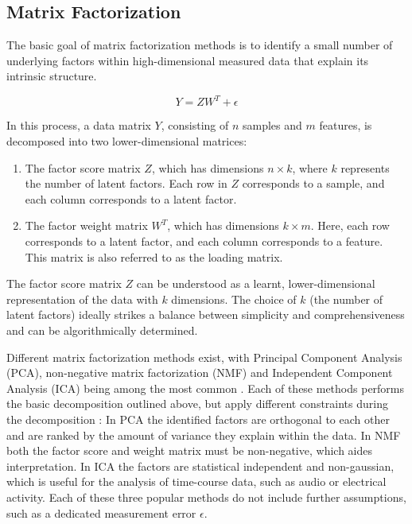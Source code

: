 \begin{flushleft}
\subsection{Matrix Factorization}
The basic goal of matrix factorization methods is to identify a small number of underlying factors within high-dimensional measured data that explain its intrinsic structure. 

\begin{equation}
    Y = ZW^T + \epsilon
\end{equation}

In this process, a data matrix \( Y \), consisting of \( n \) samples and \( m \) features, is decomposed into two lower-dimensional matrices: 

\begin{enumerate}
    \item The factor score matrix \( Z \), which has dimensions \( n \times k \), where \( k \) represents the number of latent factors. Each row in \( Z \) corresponds to a sample, and each column corresponds to a latent factor.
    \item The factor weight matrix \( W^T \), which has dimensions \( k \times m \). Here, each row corresponds to a latent factor, and each column corresponds to a feature. This matrix is also referred to as the loading matrix. 
\end{enumerate}

The factor score matrix \( Z \) can be understood as a learnt, lower-dimensional representation of the data with \( k \) dimensions. The choice of \( k \) (the number of latent factors) ideally strikes a balance between simplicity and comprehensiveness and can be algorithmically determined. 

Different matrix factorization methods exist, with Principal Component Analysis (PCA), non-negative matrix factorization (NMF) and Independent Component Analysis (ICA) being among the most common \citep{stein-obrienEnterMatrixFactorization2018}. Each of these methods performs the basic decomposition outlined above, but apply different constraints during the decomposition \citep{stein-obrienEnterMatrixFactorization2018}: In PCA the identified factors are orthogonal to each other and are ranked by the amount of variance they explain within the data. In NMF both the factor score and weight matrix must be non-negative, which aides interpretation. In ICA the factors are statistical independent and non-gaussian, which is useful for the analysis of time-course data, such as audio or electrical activity. Each of these three popular methods do not include further assumptions, such as a dedicated measurement error \(\epsilon\).


\end{flushleft}

